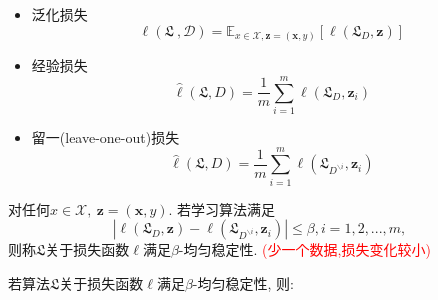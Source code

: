 \begin{itemize}
  \item 泛化损失\\
\begin{equation}
\ell \left( \mathfrak{L}\ ,\mathcal{D} \right) =\mathbb{E}_{x\in \mathcal{X},\boldsymbol{z}=\left( \boldsymbol{x,}y \right)}\left[ \ell \left( \mathfrak{L}_D,\boldsymbol{z} \right) \right]
  \end{equation}
  \item 经验损失\\
  \begin{equation}
  \hat{\ell}\left( \mathfrak{L}, D \right) =\frac{1}{m}\sum_{i=1}^m{\ell \left( \mathfrak{L}_D,\boldsymbol{z}_i \right)}
  \end{equation}
  \item 留一(leave-one-out)损失 \\
  \begin{equation}
\hat{\ell}\left( \mathfrak{L}, D \right) =\frac{1}{m}\sum_{i=1}^m{\ell \left( \mathfrak{L}_{D^{\backslash i}},\boldsymbol{z}_i \right)}
  \end{equation}
\end{itemize}


\begin{definition} 
对任何$x\in \mathcal{X},\ \boldsymbol{z}=\left( \boldsymbol{x,}y \right) $. 若学习算法满足
\begin{equation}
\left| \ell \left( \mathfrak{L}_D,\boldsymbol{z} \right) -\ell \left( \mathfrak{L}_{D^{\backslash i}},\boldsymbol{z}_i \right)\right|\le \beta ,i=1,2,...,m,
\end{equation}
则称$\mathfrak{L}$关于损失函数$\ell$满足$\beta$-均匀稳定性.  \textcolor{red}{ (少一个数据,损失变化较小)}
\end{definition}

若算法$\mathfrak{L}$关于损失函数$\ell$满足$\beta$-均匀稳定性, 则:

